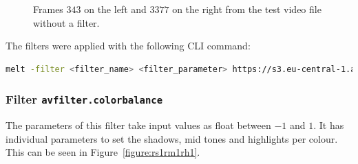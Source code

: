 \documentclass[../MasterThesis.tex]{subfiles}
\begin{document}
\begin{figure}[H]
	\begin{center}
		\caption[Frames $343$ and $3377$ from the test video file without a filter.]{Frames $343$ on the left and $3377$ on the right from the test video file without a filter.}
		\label{figure:nofilter}
	\end{center}
\end{figure}

The filters were applied with the following CLI command:
\begin{lstlisting}[language=bash, numbers=none]
	melt -filter <filter_name> <filter_parameter> https://s3.eu-central-1.amazonaws.com/accurate-player-demo-assets/timecode/sintel-2048-timecode-stereo.mp4 -consumer xgl
\end{lstlisting}















\subsubsection*{Filter \texttt{avfilter.colorbalance}}

The parameters of this filter take input values as float between $-1$ and $1$. It has individual parameters to set the shadows, mid tones and highlights per colour. This can be seen in Figure~\ref{figure:rs1rm1rh1}.
\end{document}
